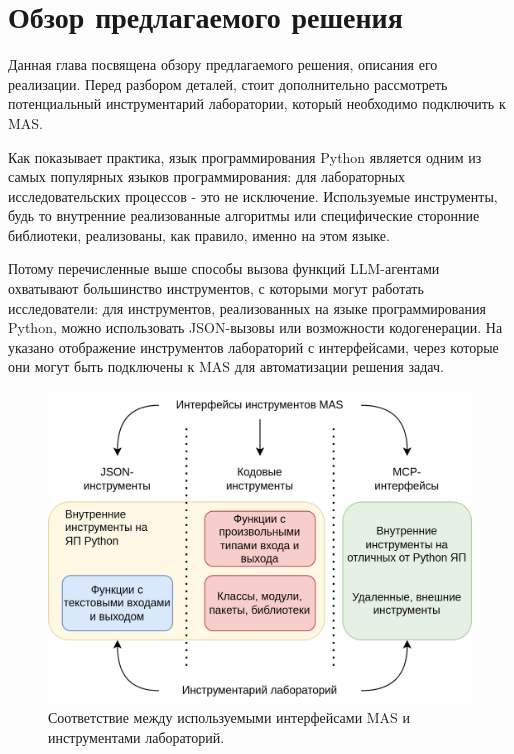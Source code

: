 \chapter{Обзор предлагаемого решения} \label{ch3}

Данная глава посвящена обзору предлагаемого решения, описания его реализации.
Перед разбором деталей, стоит дополнительно рассмотреть 
потенциальный инструментарий лаборатории, который необходимо подключить к MAS.

Как показывает практика, язык программирования Python является одним из самых популярных
языков программирования: для лабораторных исследовательских процессов - это не исключение.
Используемые инструменты, будь то внутренние реализованные алгоритмы или специфические 
сторонние библиотеки, реализованы, как правило, именно на этом языке.

Потому перечисленные выше способы вызова функций LLM-агентами охватывают 
большинство инструментов, с которыми могут работать исследователи: 
для инструментов, реализованных на языке программирования Python, 
можно использовать JSON-вызовы или возможности кодогенерации. На  
указано отображение инструментов лабораторий с интерфейсами,
через которые они могут быть подключены к MAS для автоматизации решения задач.

\begin{figure}
    \center
	\includegraphics[scale=0.24]{sources/tools_interfaces.drawio.png}
	\caption{Соответствие между используемыми интерфейсами MAS и инструментами лабораторий.} 
	\label{fig:ch3:tools}  
\end{figure}

